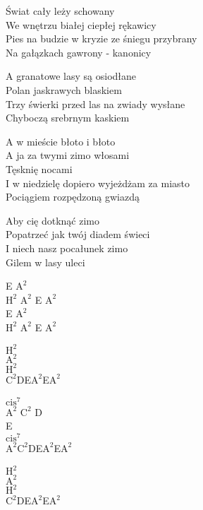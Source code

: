 \begin{text}
Świat cały leży schowany\\
We wnętrzu białej ciepłej rękawicy\\
Pies na budzie w kryzie ze śniegu przybrany\\
Na gałązkach gawrony - kanonicy

A granatowe lasy są osiodłane\\
Polan jaskrawych blaskiem\\
Trzy świerki przed las na zwiady wysłane\\
Chyboczą srebrnym kaskiem

A w mieście błoto i błoto\\
A ja za twymi zimo włosami\\
Tęsknię nocami\\
I w niedzielę dopiero wyjeżdżam za miasto\\
Pociągiem rozpędzoną gwiazdą

Aby cię dotknąć zimo\\
Popatrzeć jak twój diadem świeci\\
I niech nasz pocałunek zimo\\
Gilem w lasy uleci
\end{text}
\begin{chord}
    E $\mathrm{A^2}$\\
    $\mathrm{H^2}$ $\mathrm{A^2}$ E $\mathrm{A^2}$\\
    E $\mathrm{A^2}$\\
    \small{$\mathrm{H^2}$ $\mathrm{A^2}$ E $\mathrm{A^2}$}

    $\mathrm{H^2}$\\
    $\mathrm{A^2}$\\
    $\mathrm{H^2}$\\
    \small{$\mathrm{C^2}$DE$\mathrm{A^2}$E$\mathrm{A^2}$}

    $\mathrm{cis^7}$\\
    $\mathrm{A^2}$ $\mathrm{C^2}$ D\\
    E\\
    $\mathrm{cis^7}$\\
    \small{$\mathrm{A^2}$$\mathrm{C^2}$DE$\mathrm{A^2}$E$\mathrm{A^2}$}

    $\mathrm{H^2}$\\
    $\mathrm{A^2}$\\
    $\mathrm{H^2}$\\
    \small{$\mathrm{C^2}$DE$\mathrm{A^2}$E$\mathrm{A^2}$}
\end{chord}
